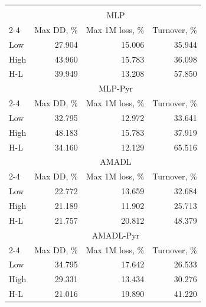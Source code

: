 \begin{tabular}{lrrr}
\hline \hline \\ [-1.8ex]
 & \multicolumn{3}{c}{MLP} \\
 \cmidrule(lr){2-4}
  & Max DD, \% & Max 1M loss, \% & Turnover, \% \\
\midrule
Low & 27.904 & 15.006 & 35.944 \\
High & 43.960 & 15.783 & 36.098 \\
H-L & 39.949 & 13.208 & 57.850 \\
\midrule
 & \multicolumn{3}{c}{MLP-Pyr} \\
 \cmidrule(lr){2-4}
  & Max DD, \% & Max 1M loss, \% & Turnover, \% \\
\midrule
Low & 32.795 & 12.972 & 33.641 \\
High & 48.183 & 15.783 & 37.919 \\
H-L & 34.160 & 12.129 & 65.516 \\
\midrule
 & \multicolumn{3}{c}{AMADL} \\
 \cmidrule(lr){2-4}
  & Max DD, \% & Max 1M loss, \% & Turnover, \% \\
\midrule
Low & 22.772 & 13.659 & 32.684 \\
High & 21.189 & 11.902 & 25.713 \\
H-L & 21.757 & 20.812 & 48.379 \\
\midrule
 & \multicolumn{3}{c}{AMADL-Pyr} \\
 \cmidrule(lr){2-4}
  & Max DD, \% & Max 1M loss, \% & Turnover, \% \\
\midrule
Low & 34.795 & 17.642 & 26.533 \\
High & 29.331 & 13.434 & 30.276 \\
H-L & 21.016 & 19.890 & 41.220 \\
\hline \hline
\end{tabular}